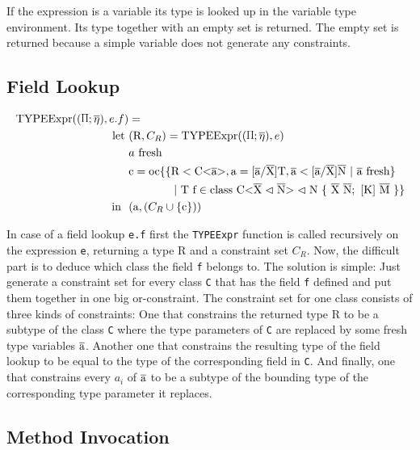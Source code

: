 If the expression is a variable its type is looked up in the variable type environment. Its type together with an empty set is returned. The empty set is returned because a simple variable does not generate any constraints.

\subsection{Field Lookup}

\begin{align*}
    \texpr{e.f} &= \\
    \text{let} \ &( \text{R}, C_R ) = \texpr{e} \\
    &\fresh{a} \\
    &\text{c} = \text{oc} \{ \{ \text{R} < \text{C<} \ot{a} \text{>}, \text{a} = \tsxsn{a}{X}{T}, \ot{a} < \tsxsns{a}{X}{N} \ | \ \fresh{\ot{a}} \} \\
    & \quad \quad \quad \quad | \ \text{T f} \in \class{X}{N} \}\\
    \text{in} \ \ & (\text{a}, (C_R \cup \{ \text{c} \} ))
\end{align*}

In case of a field lookup \verb|e.f| first the \verb|TYPEExpr| function is called recursively on the expression \verb|e|, returning a
type R and a constraint set $C_R$. Now, the difficult part is to deduce which class the field \verb|f| belongs to. The solution is simple:
Just generate a constraint set for every class \verb|C| that has the field \verb|f| defined and put them together in one big or-constraint.
The constraint set for one class consists of three kinds of constraints: One that constrains the returned type R to be a subtype
of the class \verb|C| where the type parameters of \verb|C| are replaced by some fresh type variables $\overline{\text{a}}$. Another one that constrains the resulting type of the field lookup
to be equal to the type of the corresponding field in \verb|C|. And finally, one that constrains every $a_i$ of $\overline{\text{a}}$ to be a subtype of the bounding type of the corresponding type parameter it replaces.

\subsection{Method Invocation}

